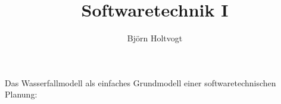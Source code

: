 \documentclass[parskip=full, 12pt]{scrartcl}
\begin{document}
\begin{titlepage}
\title{Softwaretechnik I}
\author{Björn Holtvogt}
\date{}
\maketitle
\thispagestyle{empty} %
\begin{center}
Das Wasserfallmodell als einfaches Grundmodell einer softwaretechnischen Planung:
\end{center}
\end{titlepage}
	
\newpage
\pagestyle{empty}
\tableofcontents	
\newpage
\pagestyle{plain}
\setcounter{page}{1}


\newpage

\newpage

\newpage	

\newpage

\newpage

\newpage
	
\newpage	

\newpage
		
\newpage

	
\end{document}
